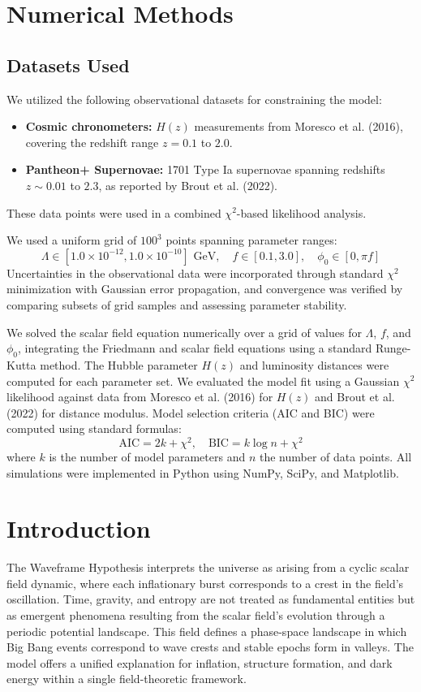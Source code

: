 \documentclass[12pt]{article}
\begin{document}
\section{Numerical Methods}

\subsection{Datasets Used}

We utilized the following observational datasets for constraining the model:

\begin{itemize}
    \item \textbf{Cosmic chronometers:} $H(z)$ measurements from Moresco et al. (2016), covering the redshift range $z = 0.1$ to $2.0$.
    \item \textbf{Pantheon+ Supernovae:} 1701 Type Ia supernovae spanning redshifts $z \sim 0.01$ to $2.3$, as reported by Brout et al. (2022).
\end{itemize}

These data points were used in a combined $\chi^2$-based likelihood analysis.



We used a uniform grid of $100^3$ points spanning parameter ranges:
\[
\Lambda \in [1.0 \times 10^{-12}, 1.0 \times 10^{-10}] \text{ GeV}, \quad
f \in [0.1, 3.0], \quad
\phi_0 \in [0, \pi f]
\]
Uncertainties in the observational data were incorporated through standard $\chi^2$ minimization with Gaussian error propagation, and convergence was verified by comparing subsets of grid samples and assessing parameter stability.

We solved the scalar field equation numerically over a grid of values for \(\Lambda\), \(f\), and \(\phi_0\), integrating the Friedmann and scalar field equations using a standard Runge-Kutta method. 
The Hubble parameter \(H(z)\) and luminosity distances were computed for each parameter set. We evaluated the model fit using a Gaussian \(\chi^2\) likelihood against data from Moresco et al. (2016) for \(H(z)\) and Brout et al. (2022) for distance modulus. 
Model selection criteria (AIC and BIC) were computed using standard formulas: 
\[\mathrm{AIC} = 2k + \chi^2, \quad \mathrm{BIC} = k \log n + \chi^2\]
where \(k\) is the number of model parameters and \(n\) the number of data points. All simulations were implemented in Python using NumPy, SciPy, and Matplotlib.
\section{Introduction}
The Waveframe Hypothesis interprets the universe as arising from a cyclic scalar field dynamic, where each inflationary burst corresponds to a crest in the field's oscillation. Time, gravity, and entropy are not treated as fundamental entities but as emergent phenomena resulting from the scalar field's evolution\cite{Padmanabhan2010, Verlinde2011} through a periodic potential landscape. This field defines a phase-space landscape in which Big Bang events correspond to wave crests and stable epochs form in valleys. The model offers a unified explanation for inflation, structure formation, and dark energy within a single field-theoretic framework.
\end{document}
